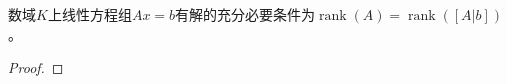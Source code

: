 \begin{theorem}
	数域$K$上线性方程组$Ax=b$有解的充分必要条件为$\operatorname{rank}(A)=\operatorname{rank}([A|b])$。
\end{theorem}
\begin{proof}
	
\end{proof}